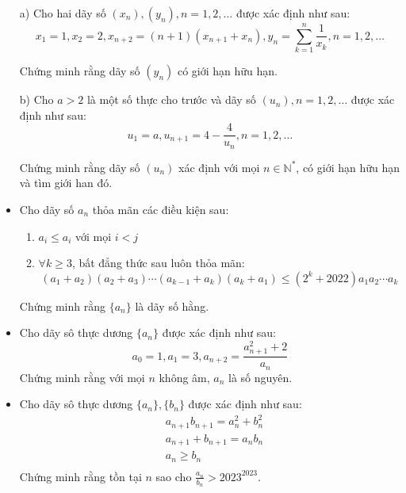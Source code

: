 \documentclass[11pt]{scrartcl}
\begin{document}
\begin{itemize}[label=, leftmargin=0em, itemsep=-0em]
\begin{btvn}
        a) Cho hai dãy số $\left(x_n\right),\left(y_n\right), n=1,2, \ldots$ được xác định như sau:
        $$
        x_1=1, x_2=2, x_{n+2}=(n+1)\left(x_{n+1}+x_n\right), y_n=\sum_{k=1}^n \frac{1}{x_k}, n=1,2, \ldots
        $$

        Chứng minh rằng dãy số $\left(y_n\right)$ có giới hạn hữu hạn.

        b) Cho $a>2$ là một số thực cho trước và dãy số $\left(u_n\right), n=1,2, \ldots$ được xác định như sau:
        $$
        u_1=a, u_{n+1}=4-\frac{4}{u_n}, n=1,2, \ldots
        $$

        Chứng minh rằng dãy số $\left(u_n\right)$ xác định với mọi $n \in \mathbb{N}^*$, có giới hạn hữu hạn và tìm giới han đó.
    \end{btvn}
    \item \begin{btvn}
        Cho dãy số ${a_n}$ thỏa mãn các điều kiện sau:
        \begin{enumerate}[label=(\alph*)]
            \item$a_i \leq a_i$ với mọi $i < j$
            \item $\forall k \geq 3$, bất đẳng thức sau luôn thỏa mãn:
            $$(a_1+a_2)(a_2+a_3)\cdots(a_{k-1}+a_k)(a_k+a_1)\leq (2^k+2022)a_1a_2\cdots a_k$$
        \end{enumerate}
        Chứng minh rằng $\{a_n\}$ là dãy số hằng.
    \end{btvn}

    \item \begin{btvn}
        Cho dãy sô thực dương $\{ a_n \}$ được xác định như sau:
    \[a_0 = 1, a_1 = 3, a_{n+2} = \frac{a_{n+1}^2+2}{a_n}\]
    Chứng minh rằng với mọi $n$ không âm, $a_n$ là số nguyên.
    \end{btvn}
 
    \item \begin{btvn}
        Cho dãy sô thực dương $\{ a_n \}, \{b_n\}$ được xác định như sau:
        \[
            \begin{aligned}
                &a_{n+1}b_{n+1}= a_n^2 + b_n^2\\
                &a_{n+1}+b_{n+1}=a_nb_n\\
                &a_n \geq b_n\\
            \end{aligned}
        \]
        Chứng minh rằng tồn tại $n$ sao cho $\frac{a_n}{b_n} > 2023^{2023}$.
    \end{btvn}


\end{itemize}
\end{document}
